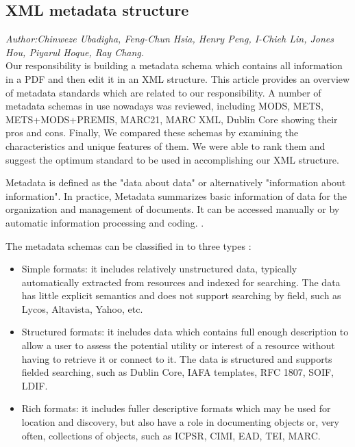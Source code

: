 % 
% 
\subsection{XML metadata structure}
\textit{\footnotesize Author:Chinweze Ubadigha, Feng-Chun Hsia, Henry Peng, I-Chieh Lin, Jones Hou, Piyarul Hoque, Ray Chang.}\label{sec:abs}\\

Our responsibility is building a metadata schema which contains all information in a PDF and then edit it in an XML structure. This article provides an overview of metadata standards which are related to our responsibility. A number of metadata schemas in use nowadays was reviewed, including MODS, METS, METS+MODS+PREMIS, MARC21, MARC XML, Dublin Core showing their pros and cons. Finally, We compared these schemas by examining the characteristics and unique features of them. We were able to rank them and suggest the optimum standard to be used in accomplishing our XML structure.

Metadata is defined as the "data about data" or alternatively "information about information". In practice, Metadata summarizes basic information of data for the organization and management of documents. It can be accessed manually or by automatic information processing and coding. \cite{underwood2003xml}.

The metadata schemas can be classified in to three types \cite{dempsey1997specification}:
\begin{itemize}
	\item Simple formats: it includes relatively unstructured data, typically automatically extracted from resources and indexed for searching. The data has little explicit semantics and does not support searching by field, such as Lycos, Altavista, Yahoo, etc.
	\item Structured formats: it includes data which contains full enough description to allow a user to assess the potential utility or interest of a resource without having to retrieve it or connect to it. The data is structured and supports fielded searching, such as Dublin Core, IAFA templates, RFC 1807, SOIF, LDIF.
	\item Rich formats: it includes fuller descriptive formats which may be used for location and discovery, but also have a role in documenting objects or, very often, collections of objects, such as ICPSR, CIMI, EAD, TEI, MARC.
\end{itemize}

